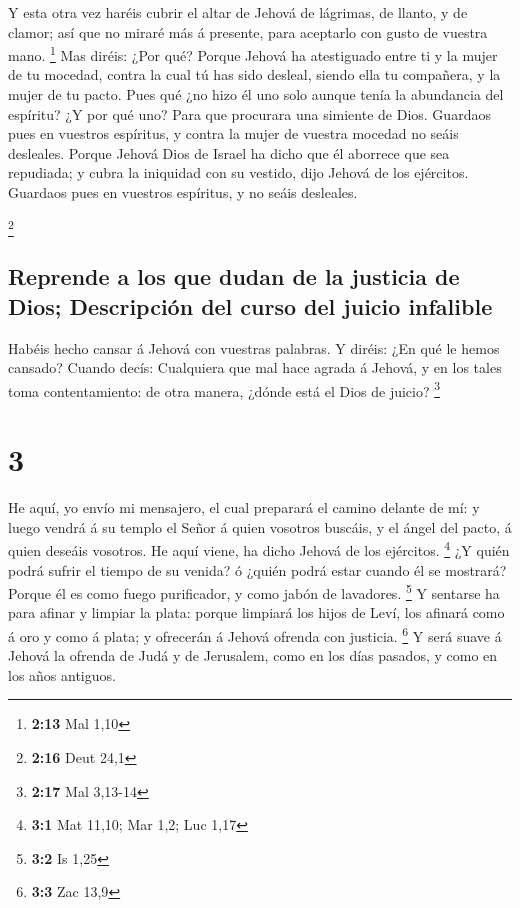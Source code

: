  Y esta otra vez haréis cubrir el altar de Jehová de
lágrimas, de llanto, y de clamor; así que no miraré más á presente, para
aceptarlo con gusto de vuestra mano. \footnote{\textbf{2:13} Mal 1,10}
 Mas diréis: ¿Por qué? Porque Jehová ha atestiguado entre
ti y la mujer de tu mocedad, contra la cual tú has sido desleal, siendo
ella tu compañera, y la mujer de tu pacto.  Pues qué ¿no
hizo él uno solo aunque tenía la abundancia del espíritu? ¿Y por qué
uno? Para que procurara una simiente de Dios. Guardaos pues en vuestros
espíritus, y contra la mujer de vuestra mocedad no seáis desleales.
 Porque Jehová Dios de Israel ha dicho que él aborrece
que sea repudiada; y cubra la iniquidad con su vestido, dijo Jehová de
los ejércitos. Guardaos pues en vuestros espíritus, y no seáis
desleales.

\footnote{\textbf{2:16} Deut 24,1}

\hypertarget{reprende-a-los-que-dudan-de-la-justicia-de-dios-descripciuxf3n-del-curso-del-juicio-infalible}{%
\subsection{Reprende a los que dudan de la justicia de Dios; Descripción
del curso del juicio
infalible}\label{reprende-a-los-que-dudan-de-la-justicia-de-dios-descripciuxf3n-del-curso-del-juicio-infalible}}

 Habéis hecho cansar á Jehová con vuestras palabras. Y
diréis: ¿En qué le hemos cansado? Cuando decís: Cualquiera que mal hace
agrada á Jehová, y en los tales toma contentamiento: de otra manera,
¿dónde está el Dios de juicio? \footnote{\textbf{2:17} Mal 3,13-14}

\hypertarget{section-2}{%
\section{3}\label{section-2}}

 He aquí, yo envío mi mensajero, el cual preparará el
camino delante de mí: y luego vendrá á su templo el Señor á quien
vosotros buscáis, y el ángel del pacto, á quien deseáis vosotros. He
aquí viene, ha dicho Jehová de los ejércitos. \footnote{\textbf{3:1} Mat
  11,10; Mar 1,2; Luc 1,17}  ¿Y quién podrá sufrir el
tiempo de su venida? ó ¿quién podrá estar cuando él se mostrará? Porque
él es como fuego purificador, y como jabón de lavadores. \footnote{\textbf{3:2}
  Is 1,25}  Y sentarse ha para afinar y limpiar la plata:
porque limpiará los hijos de Leví, los afinará como á oro y como á
plata; y ofrecerán á Jehová ofrenda con justicia. \footnote{\textbf{3:3}
  Zac 13,9}  Y será suave á Jehová la ofrenda de Judá y de
Jerusalem, como en los días pasados, y como en los años antiguos.

